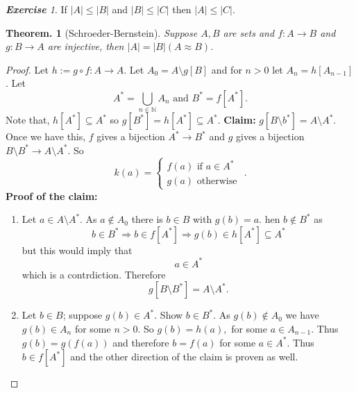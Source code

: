\documentclass[a4paper,oneside,11pt,DIV=12,parskip=half]{scrartcl}
\newcommand{\N}{\mathbb N}
\theoremstyle{plain}
\newtheorem{theorem}{Theorem.}[section]
\theoremstyle{definition}
\newtheorem{remark, definition}[theorem]{Remark and Definition.}
\newtheorem{lemma, definition}[theorem]{Lemma and Definition.}
\newtheorem{theorem, definition}[theorem]{Theorem and Definition.}
\theoremstyle{remark}
\newtheorem*{exercise}{\textbf{Exercise}}
\newtheorem*{remark, example}{\textbf{Remark and Exercise}}
\begin{document}
\begin{exercise}
    If $|A| \leq |B|$ and $|B| \leq |C|$ then $|A| \leq |C|$.
\end{exercise}

\begin{theorem}[Schroeder-Bernstein]\label{Th:Shr_Bernstein}
Suppose $A,B$ are sets and $f: A \rightarrow B$ and $g: B \rightarrow A$ are injective, then $|A| = |B| (A \approx B)$.
\end{theorem}

\begin{proof}
Let $h := g \circ f: A \rightarrow A$. Let $A_0 = A \setminus g[B]$ and for $n > 0$ let $A_n = h[A_{n-1}]$.
Let 
    \[ A^* = \bigcup_{n \in \N} A_n \text{ and } B^* = f[A^*]. \]
Note that, $h[A^*] \subseteq A^*$ so $g[B^*] = h[A^*] \subseteq A^*$.
\textbf{Claim:} $g[B \setminus b^*] = A \setminus A^*$. Once we have this, $f$ gives a bijection $A^* \rightarrow B^*$ and $g$ gives a bijection $B \setminus B^* \rightarrow A \setminus A^*$.
So
    \[ k(a) = \begin{cases} f(a) \text{ if } a \in A^* \\ g(a) \text{ otherwise }\end{cases}.\]
\textbf{Proof of the claim:} 
\begin{enumerate}
    \item Let $a \in A \setminus A^*$. As $a \not \in A_0$ there is $b \in B$ with $g(b) = a$. hen $b \not \in B^*$ as
        \[ b \in B^* \Rightarrow b \in f[A^*] \Rightarrow g(b) \in h[A^*] \subseteq A^*  \] 
    but this would imply that
        \[ a \in A^* \] which is a contrdiction. Therefore 
        \[ g[B \setminus B^*] = A \setminus A^*. \]
    \item Let $b \in B$; suppose $g(b) \in A^*$. Show $b \in B^*$.
    As $g(b) \not \in A_0$ we have $g(b) \in A_n$ for some $ n > 0$. So $g(b) = h(a),$ for some $a \in A_{n-1}$.
    Thus $g(b) = g(f(a))$ and therefore $b = f(a)$ for some $a \in A^*$. Thus $b \in f[A^*]$ and the other direction of the claim is proven as well. 
\end{enumerate}
\end{proof}
\end{document}
